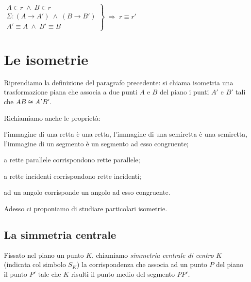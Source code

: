 \noindent\begin{minipage}{0.6\textwidth}\parindent15pt
\noindent $\left.\begin{array}{lll} A\in r \;\wedge\; B\in r\\ \Sigma 
: (A\rightarrow A') \;\wedge\; (B\rightarrow B')\\ A'\equiv A 
\;\wedge\; B'\equiv B \end{array}\right\} \;\Rightarrow\; r\equiv r'$
\end{minipage}\hfil
\begin{minipage}{0.4\textwidth}
  \centering
\end{minipage}


\section{Le isometrie}\label{sect:isometrie}

Riprendiamo la definizione del paragrafo precedente: si chiama 
isometria una trasformazione piana che associa a due punti $A$ e $B$ 
del piano i punti $A'$ e $B'$ tali che $AB\cong A'B'$.

Richiamiamo anche le proprietà:
\begin{itemize*}
\item l'immagine di una retta è una retta, l'immagine di una 
semiretta è una semiretta, l'immagine di un segmento è un segmento ad 
esso congruente;
\item a rette parallele corrispondono rette parallele;
\item a rette incidenti corrispondono rette incidenti;
\item ad un angolo corrisponde un angolo ad esso congruente.
\end{itemize*}

Adesso ci proponiamo di studiare particolari isometrie.


\subsection{La simmetria centrale}

\begin{definizione}
Fissato nel piano un punto $K$, chiamiamo \emph{simmetria centrale di 
centro $K$} (indicata col simbolo $S_K$) la  corrispondenza che 
associa ad un punto $P$ del piano il punto $P'$ tale che $K$ risulti 
il punto medio del segmento $PP'$.
\end{definizione}

